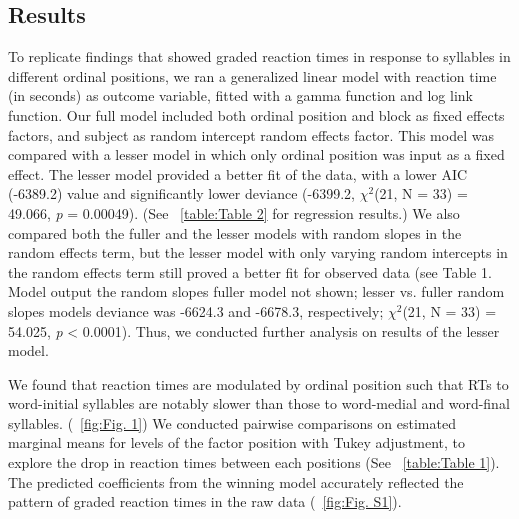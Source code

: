 \documentclass[11pt]{article}
\begin{document}
\subsection{Results}
To replicate findings that showed graded reaction times in response to syllables in 
different ordinal positions, we ran a generalized linear model with reaction time (in 
seconds) as outcome variable, fitted with a gamma function and log link function. %
Our full model included both ordinal position and block as fixed effects factors, and 
subject as random intercept random effects factor. This model was compared with a lesser
model in which only ordinal position was input as a fixed effect. The lesser model provided
a better fit of the data, with a lower AIC (-6389.2) value and significantly lower deviance 
(-6399.2, ${\chi}^{2}$(21, N = 33) = 49.066, \textit{p} = 0.00049). (See ~\ref{table:Table 2} for regression
results.)
We also compared both the fuller and the lesser models with random slopes in the random effects
term, but the lesser model with only varying random intercepts in the random effects term still
proved a better fit for observed data (see Table 1. Model output the random slopes fuller model not shown; lesser vs. fuller random slopes models deviance was -6624.3 and -6678.3, respectively; 
${\chi}^{2}$(21, N = 33) = 54.025, \textit{p} < 0.0001). Thus, we conducted further analysis on
results of the lesser model. 

We found that reaction times are modulated by ordinal position such that RTs to word-initial syllables
are notably slower than those to word-medial and word-final syllables. (~\ref{fig:Fig. 1}) We conducted pairwise comparisons on estimated marginal means for levels of the factor 
position with Tukey adjustment, to explore the drop in reaction times between each positions 
(See ~\ref{table:Table 1}). The predicted coefficients from the winning model accurately
reflected the pattern of graded reaction times in the raw data (~\ref{fig:Fig. S1}).
\end{document}
